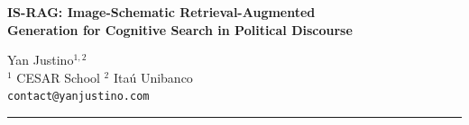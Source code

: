 \documentclass[11pt,a4paper]{article}
\begin{document}
\begin{center}
  {\Large\bfseries IS-RAG: Image-Schematic Retrieval-Augmented\\
   Generation for Cognitive Search in Political Discourse}

  \vspace{0.8em}

  {\normalsize
    Yan Justino$^{1,2}$ \\[4pt]
    $^1$ CESAR School \quad $^2$ Itaú Unibanco \\[4pt]
    \texttt{contact@yanjustino.com}
  }

  \vspace{0.6em}
  \rule{\linewidth}{0.4pt}
\end{center}

\end{document}
